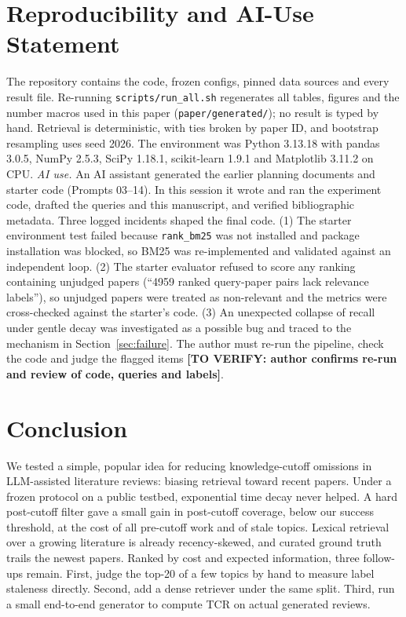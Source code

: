 \documentclass[acmsmall]{acmart}
\newcommand{\TODO}[1]{\textbf{[TO VERIFY: #1]}}
\begin{document}
\section{Reproducibility and AI-Use Statement}\label{sec:repro}
The repository contains the code, frozen configs, pinned data sources and every result file. Re-running \texttt{scripts/run\_all.sh} regenerates all tables, figures and the number macros used in this paper (\texttt{paper/generated/}); no result is typed by hand. Retrieval is deterministic, with ties broken by paper ID, and bootstrap resampling uses seed 2026. The environment was Python 3.13.18 with pandas 3.0.5, NumPy 2.5.3, SciPy 1.18.1, scikit-learn 1.9.1 and Matplotlib 3.11.2 on CPU.
\emph{AI use.} An AI assistant generated the earlier planning documents and starter code (Prompts 03--14). In this session it wrote and ran the experiment code, drafted the queries and this manuscript, and verified bibliographic metadata. Three logged incidents shaped the final code. (1) The starter environment test failed because \texttt{rank\_bm25} was not installed and package installation was blocked, so BM25 was re-implemented and validated against an independent loop. (2) The starter evaluator refused to score any ranking containing unjudged papers (``4959 ranked query-paper pairs lack relevance labels''), so unjudged papers were treated as non-relevant and the metrics were cross-checked against the starter's code. (3) An unexpected collapse of recall under gentle decay was investigated as a possible bug and traced to the mechanism in Section~\ref{sec:failure}. The author must re-run the pipeline, check the code and judge the flagged items \TODO{author confirms re-run and review of code, queries and labels}.

\section{Conclusion}\label{sec:conclusion}
We tested a simple, popular idea for reducing knowledge-cutoff omissions in LLM-assisted literature reviews: biasing retrieval toward recent papers. Under a frozen protocol on a public testbed, exponential time decay never helped. A hard post-cutoff filter gave a small gain in post-cutoff coverage, below our success threshold, at the cost of all pre-cutoff work and of stale topics. Lexical retrieval over a growing literature is already recency-skewed, and curated ground truth trails the newest papers. Ranked by cost and expected information, three follow-ups remain. First, judge the top-20 of a few topics by hand to measure label staleness directly. Second, add a dense retriever under the same split. Third, run a small end-to-end generator to compute TCR on actual generated reviews.



\end{document}
